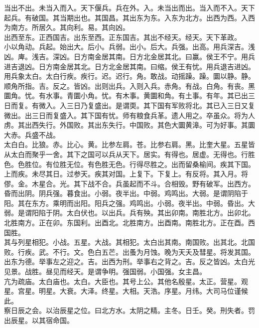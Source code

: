 \documentclass{zhvt-classic}
\begin{document}
\hspace*{2em}当出不出。未当入而入。天下偃兵。兵在外。入。未当出而出。当入而不入。天下起兵。有破国。其当期出也。其国昌。其出东为东。入东为北方。出西为西。入西为南方。所居久。其向利。易。其向凶。\\
\hspace*{2em}出西至东。正西国吉。出东至西。正东国吉。其出不经天。经天。天下革政。\\
\hspace*{2em}小以角动。兵起。始出大。后小。兵弱。出小。后大。兵强。出高。用兵深吉。浅凶。庳。浅吉。深凶。日方南金居其南。日方北金居其北。曰赢。侯王不宁。用兵进吉退凶。日方南金居其北。日方北金居其南。曰缩。侯王有忧。用兵退吉进凶。用兵象太白。太白行疾。疾行。迟。迟行。角。敢战。动摇躁。躁。圜以静。静。顺角所指。吉。反之。皆凶。出则出兵。入则入兵。赤角。有战。白角。有丧。黑圜角。忧。有水事。青圜小角。忧。有木事。黄圜和角。有土事。有年。其已出三日而复。有微入。入三日乃复盛出。是谓耎。其下国有军败将北。其已入三日又复微出。出三日而复盛入。其下国有忧。师有粮食兵革。遗人用之。卒虽众。将为人虏。其出西失行。外国败。其出东失行。中国败。其色大圜黄滜。可为好事。其圜大赤。兵盛不战。\\
\hspace*{2em}太白白。比狼。赤。比心。黄。比参左肩。苍。比参右肩。黑。比奎大星。五星皆从太白而聚乎一舍。其下之国可以兵从天下。居实。有得也。居虚。无得也。行胜色。色胜位。有位胜无位。有色胜无色。行得尽胜之。出而留桑榆间。疾其下国。上而疾。未尽其日。过参天。疾其对国。上复下。下复上。有反将。其入月。将僇。金。木星合。光。其下战不合。兵虽起而不斗。合相毁。野有破军。出西方。昏而出阴。阴兵强。暮食出。小弱。夜半出。中弱。鸡鸣出。大弱。是谓阴陷于阳。其在东方。乘明而出阳。阳兵之强。鸡鸣出。小弱。夜半出。中弱。昏出。大弱。是谓阳陷于阴。太白伏也。以出兵。兵有殃。其出卯南。南胜北方。出卯北。北胜南方。正在卯。东国利。出酉北。北胜南方。出酉南。南胜北方。正在酉。西国胜。\\
\hspace*{2em}其与列星相犯。小战。五星。大战。其相犯。太白出其南。南国败。出其北。北国败。行疾。武。不行。文。色白五芒。出蚤为月蚀。晚为天夭及彗星。将发其国。出东为德。举事左之迎之。吉。出西为刑。举事右之背之。吉。反之皆凶。太白光见景。战胜。昼见而经天。是谓争明。强国弱。小国强。女主昌。\\
\hspace*{2em}亢为疏庙。太白庙也。太白。大臣也。其号上公。其他名殷星。太正。营星。观星。宫星。明星。大衰。大泽。终星。大相。天浩。序星。月纬。大司马位谨候此。\\
\hspace*{2em}察日辰之会。以治辰星之位。曰北方水。太阴之精。主冬。日壬。癸。刑失者。罚出辰星。以其宿命国。\\
\end{document}
